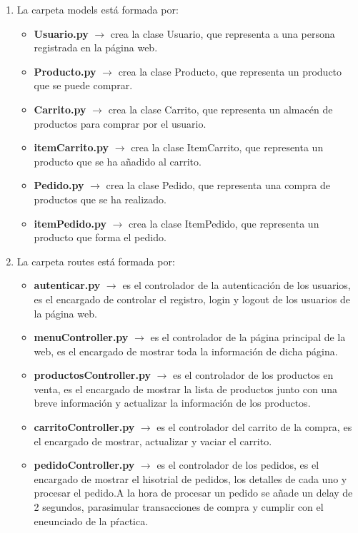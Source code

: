 \documentclass[10pt]{book}
\begin{document}
\begin{enumerate}
        \item  La carpeta models está formada por:
            \begin{itemize}
                \item \textbf{Usuario.py} $\rightarrow$ crea la clase Usuario, que representa a una persona registrada en la página web.
                \item \textbf{Producto.py} $\rightarrow$ crea la clase Producto, que representa un producto que se puede comprar.
                \item \textbf{Carrito.py} $\rightarrow$ crea la clase Carrito, que representa un almacén de productos para comprar por el usuario.
                \item \textbf{itemCarrito.py} $\rightarrow$ crea la clase ItemCarrito, que representa un producto que se ha añadido al carrito.
                \item \textbf{Pedido.py} $\rightarrow$ crea la clase Pedido, que representa una compra de productos que se ha realizado.
                \item \textbf{itemPedido.py} $\rightarrow$ crea la clase ItemPedido, que representa un producto que forma el pedido.
            \end{itemize}
        \item  La carpeta routes está formada por:
            \begin{itemize}
                \item \textbf{autenticar.py} $\rightarrow$ es el controlador de la autenticación de los usuarios, es el encargado de controlar el registro, login y logout de los usuarios de la página web.
                \item \textbf{menuController.py} $\rightarrow$ es el controlador de la página principal de la web, es el encargado de mostrar toda la información de dicha página.
                \item \textbf{productosController.py} $\rightarrow$ es el controlador de los productos en venta, es el encargado de mostrar la lista de productos junto con una breve información y actualizar la información de los productos.
                \item \textbf{carritoController.py} $\rightarrow$ es el controlador del carrito de la compra, es el encargado de mostrar, actualizar y vaciar el carrito.
                \item \textbf{pedidoController.py} $\rightarrow$ es el controlador de los pedidos, es el encargado de mostrar el hisotrial de pedidos, los detalles de cada uno y procesar el pedido.A la hora de procesar un pedido se añade un delay de 2 segundos, parasimular transacciones de compra y cumplir con el eneunciado de la pŕactica.

\end{itemize}
\end{enumerate}
\end{document}
